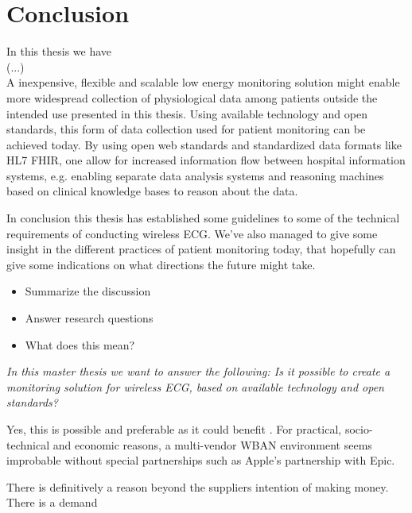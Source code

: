 \section{Conclusion} %
\label{sec:conclusion}

In this thesis we have 
\\
\newline
(...)
\\
\newline
A inexpensive, flexible and scalable low energy monitoring solution might enable more widespread collection of physiological data among patients outside the intended use presented in this thesis. Using available technology and open standards, this form of data collection used for patient monitoring can be achieved today. By using open web standards and standardized data formats like HL7 FHIR, one allow for increased information flow between hospital information systems, e.g. enabling separate data analysis systems and reasoning machines based on clinical knowledge bases to reason about the data.

In conclusion this thesis has established some guidelines to some of the technical requirements of conducting wireless ECG. We've also managed to give some insight in the different practices of patient monitoring today, that hopefully can give some indications on what directions the future might take.

\begin{itemize}
  \item Summarize the discussion
  \item Answer research questions
  \item What does this mean?
\end{itemize}


\textit{In this master thesis we want to answer the following: Is it possible to create a monitoring solution for wireless ECG, based on available technology and open standards?}

Yes, this is possible and preferable as it could benefit . For practical, socio-technical and economic reasons, a multi-vendor WBAN environment seems improbable without special partnerships such as Apple's partnership with Epic. 

There is definitively a reason beyond the suppliers intention of making money. There is a demand 



